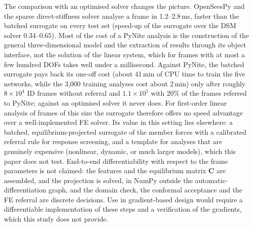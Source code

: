 The comparison with an optimised solver changes the picture. OpenSeesPy and the sparse direct-stiffness solver analyse a frame in 1.2--2.8\,ms, faster than the batched surrogate on every test set (speed-up of the surrogate over the DSM solver 0.34--0.65). Most of the cost of a PyNite analysis is the construction of the general three-dimensional model and the extraction of results through its object interface, not the solution of the linear system, which for frames with at most a few hundred DOFs takes well under a millisecond. Against PyNite, the batched surrogate pays back its one-off cost (about 41\,min of CPU time to train the five networks, while the 3{,}000 training analyses cost about 2\,min) only after roughly $8\times10^4$ ID frames without referral and $1.1\times10^5$ with 20\% of the frames referred to PyNite; against an optimised solver it never does. For first-order linear analysis of frames of this size the surrogate therefore offers no speed advantage over a well-implemented FE solver. Its value in this setting lies elsewhere: a batched, equilibrium-projected surrogate of the member forces with a calibrated referral rule for response screening, and a template for analyses that are genuinely expensive (nonlinear, dynamic, or much larger models), which this paper does not test. End-to-end differentiability with respect to the frame parameters is not claimed: the features and the equilibrium matrix $\mathbf{C}$ are assembled, and the projection is solved, in NumPy outside the automatic-differentiation graph, and the domain check, the conformal acceptance and the FE referral are discrete decisions. Use in gradient-based design would require a differentiable implementation of these steps and a verification of the gradients, which this study does not provide.
